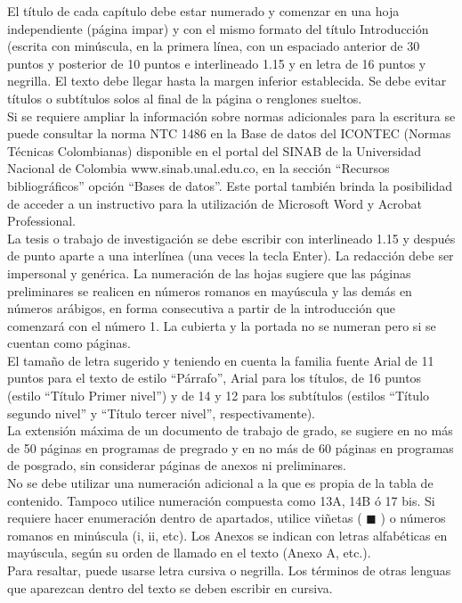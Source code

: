 El título de cada capítulo debe estar numerado y comenzar en una hoja independiente (página impar) y con el mismo formato del título Introducción (escrita con minúscula, en la primera línea, con un espaciado anterior de 30 puntos y posterior de 10 puntos e interlineado 1.15 y en letra de 16 puntos y negrilla. El texto debe llegar hasta la margen inferior establecida. Se debe evitar títulos o subtítulos solos al final de la página o renglones sueltos. \\

Si se requiere ampliar la información sobre normas adicionales para la escritura se puede consultar la norma NTC 1486 en la Base de datos del ICONTEC (Normas Técnicas Colombianas) disponible en el portal del SINAB de la Universidad Nacional de Colombia www.sinab.unal.edu.co, en la sección “Recursos bibliográficos” opción “Bases de datos”.  Este portal también brinda la posibilidad de acceder a un instructivo para la utilización de Microsoft Word y Acrobat Professional.\\

La tesis o trabajo de investigación se debe escribir con interlineado 1.15 y después de punto aparte a una interlínea (una veces la tecla Enter). La redacción debe ser impersonal y genérica. La numeración de las hojas sugiere que las páginas preliminares se realicen en números romanos en mayúscula y las demás en números arábigos, en forma consecutiva a partir de la introducción que comenzará con el número 1. La cubierta y la portada no se numeran pero si se cuentan como páginas.\\

El tamaño de letra sugerido y teniendo en cuenta la familia fuente Arial de 11 puntos para el texto de estilo “Párrafo”, Arial para los títulos, de 16 puntos (estilo “Título Primer nivel”) y de 14 y 12 para los subtítulos (estilos “Título segundo nivel” y “Título tercer nivel”, respectivamente). \\

La extensión máxima de un documento de trabajo de grado, se sugiere en no más de 50 páginas en programas de pregrado y en no más de 60 páginas en programas de posgrado, sin considerar páginas de anexos ni preliminares.\\

No se debe utilizar una numeración adicional a la que es propia de la tabla de contenido. Tampoco utilice numeración compuesta como 13A, 14B ó 17 bis.  Si requiere hacer enumeración dentro de apartados, utilice viñetas ( $\blacksquare$ ) o números romanos en minúscula (i, ii, etc). Los Anexos se indican con letras alfabéticas en mayúscula, según su orden de llamado en el texto (Anexo A, etc.). \\

Para resaltar, puede usarse letra cursiva o negrilla. Los términos de otras lenguas que aparezcan dentro del texto se deben escribir en cursiva.\\
 
